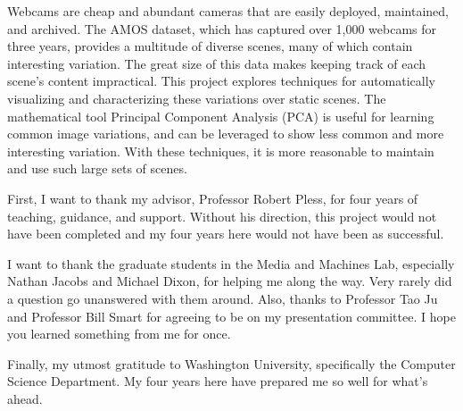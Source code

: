 %

\begin{thesistitlepage}               %
\end{thesistitlepage}

\begin{thesisabstract}
Webcams are cheap and abundant cameras that are easily deployed, maintained, and archived.  The AMOS dataset, which has captured over 1,000 webcams for three years, provides a multitude of diverse scenes, many of which contain interesting variation.  The great size of this data makes keeping track of each scene's content impractical.  This project explores techniques for automatically visualizing and characterizing these variations over static scenes.  The mathematical tool Principal Component Analysis (PCA) is useful for learning common image variations, and can be leveraged to show less common and more interesting variation.  With these techniques, it is more reasonable to maintain and use such large sets of scenes.
\end{thesisabstract}

\begin{thesisacknowledgments}

First, I want to thank my advisor, Professor Robert Pless, for four years of teaching, guidance, and support.  Without his direction, this project would not have been completed and my four years here would not have been as successful.

I want to thank the graduate students in the Media and Machines Lab, especially Nathan Jacobs and Michael Dixon, for helping me along the way.  Very rarely did a question go unanswered with them around.  Also, thanks to Professor Tao Ju and Professor Bill Smart for agreeing to be on my presentation committee.  I hope you learned something from me for once.

Finally, my utmost gratitude to Washington University, specifically the Computer Science Department.  My four years here have prepared me so well for what's ahead.

\end{thesisacknowledgments}


\begin{singlespace}
\tableofcontents



\listoffigures
\end{singlespace}

